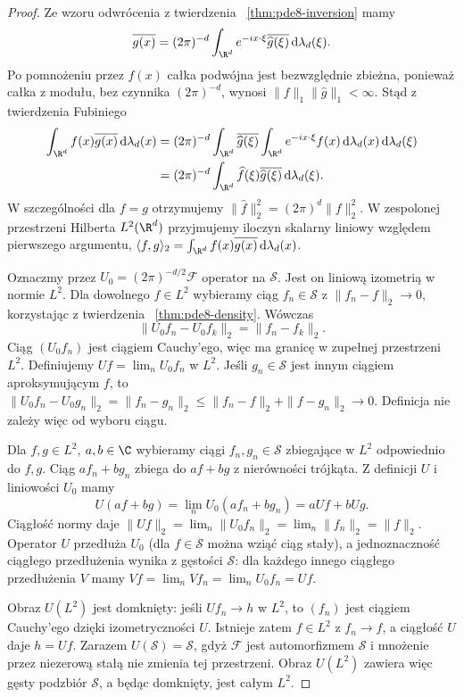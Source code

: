 \begin{proof}
Ze wzoru odwrócenia z twierdzenia
~\ref{thm:pde8-inversion} mamy
\[
 \overline{g(x)}=(2\pi)^{-d}\int_{\R^d}
 e^{-ix\cdot\xi}\overline{\widehat g(\xi)}
 \,\mathrm d\lambda_d(\xi).
\]
Po pomnożeniu przez $f(x)$ całka podwójna
jest bezwzględnie zbieżna, ponieważ całka
z modułu, bez czynnika $(2\pi)^{-d}$, wynosi
$\|f\|_1\|\widehat g\|_1<\infty$.
Stąd z twierdzenia Fubiniego
\[
 \begin{aligned}
 \int_{\R^d}f(x)\overline{g(x)}\,\mathrm d\lambda_d(x)
 &=(2\pi)^{-d}\int_{\R^d}
 \overline{\widehat g(\xi)}
 \int_{\R^d}e^{-ix\cdot\xi}f(x)
 \,\mathrm d\lambda_d(x)\,\mathrm d\lambda_d(\xi)\\
 &=(2\pi)^{-d}\int_{\R^d}
 \widehat f(\xi)\overline{\widehat g(\xi)}
 \,\mathrm d\lambda_d(\xi).
 \end{aligned}
\]
W szczególności dla $f=g$ otrzymujemy
$\|\widehat f\|_2^2=(2\pi)^d\|f\|_2^2$.
W zespolonej przestrzeni Hilberta $L^2(\R^d)$
przyjmujemy iloczyn skalarny liniowy względem
pierwszego argumentu,
$\langle f,g\rangle_2=\int_{\R^d}f(x)\overline{g(x)}
\,\mathrm d\lambda_d(x)$.

Oznaczmy przez $U_0=(2\pi)^{-d/2}\mathcal F$
operator na $\mathcal S$. Jest on liniową izometrią
w normie $L^2$. Dla dowolnego $f\in L^2$
wybieramy ciąg $f_n\in\mathcal S$ z
$\|f_n-f\|_2\to0$, korzystając z twierdzenia
~\ref{thm:pde8-density}. Wówczas
\[
 \|U_0f_n-U_0f_k\|_2=\|f_n-f_k\|_2.
\]
Ciąg $(U_0f_n)$ jest ciągiem Cauchy'ego,
więc ma granicę w zupełnej przestrzeni $L^2$.
Definiujemy $Uf=\lim_n U_0f_n$ w $L^2$.
Jeśli $g_n\in\mathcal S$ jest innym ciągiem
aproksymującym $f$, to
$\|U_0f_n-U_0g_n\|_2=\|f_n-g_n\|_2
\le\|f_n-f\|_2+\|f-g_n\|_2\to0$.
Definicja nie zależy więc od wyboru ciągu.

Dla $f,g\in L^2$, $a,b\in\C$ wybieramy
ciągi $f_n,g_n\in\mathcal S$ zbiegające
w $L^2$ odpowiednio do $f,g$.
Ciąg $af_n+bg_n$ zbiega do $af+bg$
z nierówności trójkąta. Z definicji $U$
i liniowości $U_0$ mamy
\[
 U(af+bg)=\lim_n U_0(af_n+bg_n)
 =aUf+bUg.
\]
Ciągłość normy daje
$\|Uf\|_2=\lim_n\|U_0f_n\|_2
=\lim_n\|f_n\|_2=\|f\|_2$.
Operator $U$ przedłuża $U_0$ (dla $f\in\mathcal S$
można wziąć ciąg stały), a jednoznaczność
ciągłego przedłużenia wynika z gęstości $\mathcal S$:
dla każdego innego ciągłego przedłużenia $V$
mamy $Vf=\lim_n Vf_n=\lim_n U_0f_n=Uf$.

Obraz $U(L^2)$ jest domknięty: jeśli $Uf_n\to h$
w $L^2$, to $(f_n)$ jest ciągiem Cauchy'ego
dzięki izometryczności $U$. Istnieje zatem
$f\in L^2$ z $f_n\to f$, a ciągłość $U$ daje
$h=Uf$. Zarazem $U(\mathcal S)=\mathcal S$,
gdyż $\mathcal F$ jest automorfizmem $\mathcal S$
i mnożenie przez niezerową stałą nie zmienia
tej przestrzeni. Obraz $U(L^2)$ zawiera więc
gęsty podzbiór $\mathcal S$, a będąc domknięty,
jest całym $L^2$.


\end{proof}
